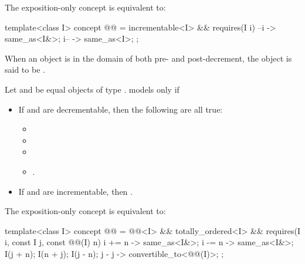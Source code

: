 \pnum
The exposition-only  concept is equivalent to:
\begin{itemdecl}
template<class I>
  concept @@ =
    incrementable<I> && requires(I i) {
      { --i } -> same_as<I&>;
      { i-- } -> same_as<I>;
    };
\end{itemdecl}

\begin{itemdescr}
\pnum
When an object is in the domain of both pre- and post-decrement,
the object is said to be .

\pnum
Let  and  be equal objects of type .
 models  only if
\begin{itemize}
\item If  and  are decrementable,
  then the following are all true:
  \begin{itemize}
  \item {}
  \item {}
  \item {}
  \item {}.
  \end{itemize}
\item If  and  are incrementable,
  then .
\end{itemize}
\end{itemdescr}

\pnum
The exposition-only  concept is equivalent to:
\begin{itemdecl}
template<class I>
  concept @@ =
    @@<I> && totally_ordered<I> &&
    requires(I i, const I j, const @@(I) n) {
      { i += n } -> same_as<I&>;
      { i -= n } -> same_as<I&>;
      I(j + n);
      I(n + j);
      I(j - n);
      { j - j } -> convertible_to<@@(I)>;
    };
\end{itemdecl}

